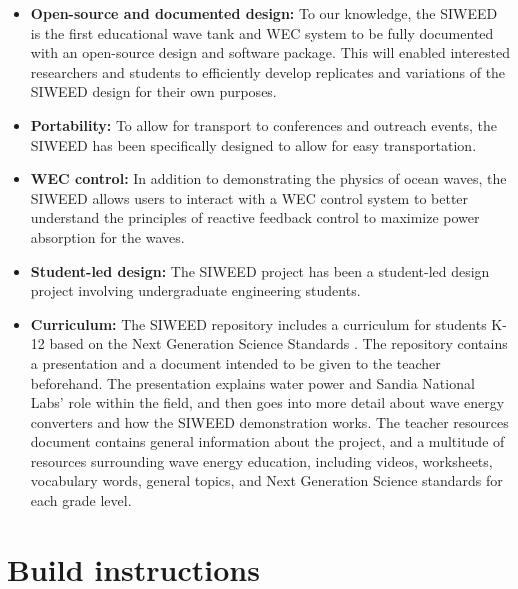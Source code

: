 \documentclass[hardware,article,submit,pdftex,moreauthors]{Definitions/mdpi}
\begin{document}
\begin{itemize}
  \item \textbf{Open-source and documented design:} To our knowledge, the SIWEED is the first educational wave tank and WEC system to be fully documented with an open-source design and software package.
  This will enabled interested researchers and students to efficiently develop replicates and variations of the SIWEED design for their own purposes.
  \item \textbf{Portability:} To allow for transport to conferences and outreach events, the SIWEED has been specifically designed to allow for easy transportation.
  \item \textbf{WEC control:} In addition to demonstrating the physics of ocean waves, the SIWEED allows users to interact with a WEC control system to better understand the principles of reactive feedback control to maximize power absorption for the waves.
  \item \textbf{Student-led design:} The SIWEED project has been a student-led design project involving undergraduate engineering students.
  \item \textbf{Curriculum:} The SIWEED repository includes a curriculum for students K-12 based on the Next Generation Science Standards \cite{NextGenScience2021}. 
  The repository contains a presentation and a document intended to be given to the teacher beforehand. 
  The presentation explains water power and Sandia National Labs' role within the field, and then goes into more detail about wave energy converters and how the SIWEED demonstration works.
  The teacher resources document contains general information about the project, and a multitude of resources surrounding wave energy education, including videos, worksheets, vocabulary words, general topics, and Next Generation Science standards for each grade level.
\end{itemize}

\section{Build instructions}
\end{document}
